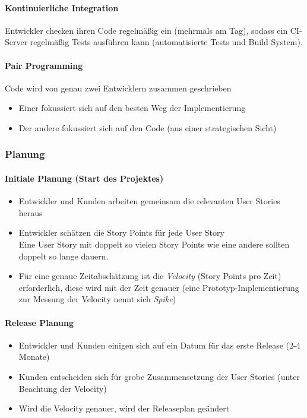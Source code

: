 \documentclass[
    ngerman,
    color=3b,
    summary,
    boxarc,
    main,
]{rubos-tuda-template}
\begin{document}
\paragraph{Kontinuierliche Integration}
Entwickler checken ihren Code regelmäßig ein (mehrmals am Tag), sodass ein CI-Server regelmäßig Tests ausführen kann (automatisierte Tests und Build System).

\paragraph{Pair Programming}
Code wird von genau zwei Entwicklern zusammen geschrieben
\begin{itemize}
    \item Einer fokussiert sich auf den besten Weg der Implementierung
    \item Der andere fokussiert sich auf den Code (aus einer strategischen Sicht)
\end{itemize}

\subsubsection{Planung}
\paragraph{Initiale Planung (Start des Projektes)}
\begin{itemize}
    \item Entwickler und Kunden arbeiten gemeinsam die relevanten User Stories heraus
    \item Entwickler schätzen die Story Points für jede User Story \\
          {\small Eine User Story mit doppelt so vielen Story Points wie eine andere sollten doppelt so lange dauern.}
    \item Für eine genaue Zeitabschätzung ist die \textit{Velocity} (Story Points pro Zeit) erforderlich, diese wird mit der Zeit genauer (eine Prototyp-Implementierung zur Messung der Velocity nennt sich \textit{Spike})
\end{itemize}

\paragraph{Release Planung}
\begin{itemize}
    \item Entwickler und Kunden einigen sich auf ein Datum für das erste Release (2-4 Monate)
    \item Kunden entscheiden sich für grobe Zusammensetzung der User Stories (unter Beachtung der Velocity)
    \item Wird die Velocity genauer, wird der Releaseplan geändert
\end{itemize}
\end{document}
